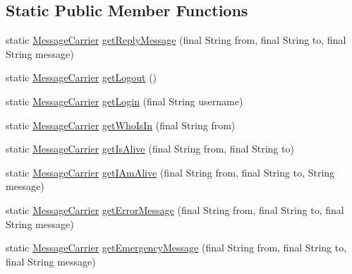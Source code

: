 \subsection*{Static Public Member Functions}
\begin{DoxyCompactItemize}
\item 
static \hyperlink{classgov_1_1fnal_1_1ppd_1_1ZZattic_1_1MessageCarrier}{Message\-Carrier} \hyperlink{classgov_1_1fnal_1_1ppd_1_1ZZattic_1_1MessageCarrier_a05fcdd9a65e13647a607f02dbbb7951e}{get\-Reply\-Message} (final String from, final String to, final String message)
\item 
static \hyperlink{classgov_1_1fnal_1_1ppd_1_1ZZattic_1_1MessageCarrier}{Message\-Carrier} \hyperlink{classgov_1_1fnal_1_1ppd_1_1ZZattic_1_1MessageCarrier_ad9e1be15442ebf3281dcea40659f371b}{get\-Logout} ()
\item 
static \hyperlink{classgov_1_1fnal_1_1ppd_1_1ZZattic_1_1MessageCarrier}{Message\-Carrier} \hyperlink{classgov_1_1fnal_1_1ppd_1_1ZZattic_1_1MessageCarrier_ad98002f66c7e7153bbbd467ac905f0e3}{get\-Login} (final String username)
\item 
static \hyperlink{classgov_1_1fnal_1_1ppd_1_1ZZattic_1_1MessageCarrier}{Message\-Carrier} \hyperlink{classgov_1_1fnal_1_1ppd_1_1ZZattic_1_1MessageCarrier_a3676c7c503d34d46f3dee419089f6f75}{get\-Who\-Is\-In} (final String from)
\item 
static \hyperlink{classgov_1_1fnal_1_1ppd_1_1ZZattic_1_1MessageCarrier}{Message\-Carrier} \hyperlink{classgov_1_1fnal_1_1ppd_1_1ZZattic_1_1MessageCarrier_a86a35463360886690da6dea7c575264b}{get\-Is\-Alive} (final String from, final String to)
\item 
static \hyperlink{classgov_1_1fnal_1_1ppd_1_1ZZattic_1_1MessageCarrier}{Message\-Carrier} \hyperlink{classgov_1_1fnal_1_1ppd_1_1ZZattic_1_1MessageCarrier_a4d77813aa4228365836ec44a2d791ebe}{get\-I\-Am\-Alive} (final String from, final String to, String message)
\item 
static \hyperlink{classgov_1_1fnal_1_1ppd_1_1ZZattic_1_1MessageCarrier}{Message\-Carrier} \hyperlink{classgov_1_1fnal_1_1ppd_1_1ZZattic_1_1MessageCarrier_a02824e0d50129653a9f1eb264de59565}{get\-Error\-Message} (final String from, final String to, final String message)
\item 
static \hyperlink{classgov_1_1fnal_1_1ppd_1_1ZZattic_1_1MessageCarrier}{Message\-Carrier} \hyperlink{classgov_1_1fnal_1_1ppd_1_1ZZattic_1_1MessageCarrier_ad2376d2ae604000b73c70a6492e87849}{get\-Emergency\-Message} (final String from, final String to, final String message)

\end{DoxyCompactItemize}

